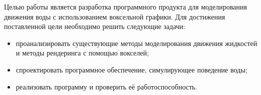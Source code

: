 \Introduction

Целью работы является разработка программного продукта для моделирования движения воды с использованием воксельной графики. Для достижения поставленной цели необходимо решить следующие задачи:

\begin{itemize}
\item проанализировать существующие методы моделирования движения жидкостей и методы рендеринга с помощью вокселей;
\item спроектировать программное обеспечение, симулирующее поведение воды;
\item реализовать программу и проверить её работоспособность.
\end{itemize}
